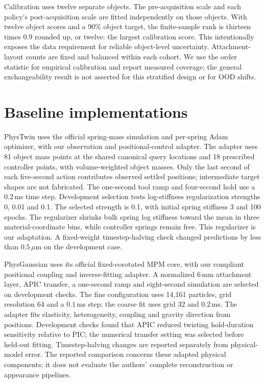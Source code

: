 \documentclass[10pt,twocolumn,letterpaper]{article}
\begin{document}
Calibration uses twelve separate objects. The pre-acquisition scale and each policy's post-acquisition scale are fitted independently on those objects. With twelve object scores and a 90\% object target, the finite-sample rank is thirteen times 0.9 rounded up, or twelve: the largest calibration score. This intentionally exposes the data requirement for reliable object-level uncertainty. Attachment-layout counts are fixed and balanced within each cohort. We use the order statistic for empirical calibration and report measured coverage; the general exchangeability result is not asserted for this stratified design or for OOD shifts.

\section{Baseline implementations}
PhysTwin uses the official spring-mass simulation and per-spring Adam optimizer, with our observation and positional-control adapter. The adapter uses 81 object mass points at the shared canonical query locations and 18 prescribed controller points, with volume-weighted object masses. Only the last second of each five-second action contributes observed settled positions; intermediate target shapes are not fabricated. The one-second tool ramp and four-second hold use a $0.2$\,ms time step. Development selection tests log-stiffness regularization strengths 0, 0.01 and 0.1. The selected strength is 0.1, with initial spring stiffness 3 and 100 epochs. The regularizer shrinks bulk spring log stiffness toward the mean in three material-coordinate bins, while controller springs remain free. This regularizer is our adaptation. A fixed-weight timestep-halving check changed predictions by less than $0.5\,\mu$m on the development case.

PhysGaussian uses its official fixed-corotated MPM core, with our compliant positional coupling and inverse-fitting adapter. A normalized 6\,mm attachment layer, APIC transfer, a one-second ramp and eight-second simulation are selected on development checks. The fine configuration uses 14,161 particles, grid resolution 64 and a $0.1$\,ms step; the coarse fit uses grid 32 and $0.2$\,ms. The adapter fits elasticity, heterogeneity, coupling and gravity direction from positions. Development checks found that APIC reduced twisting hold-duration sensitivity relative to PIC; the numerical transfer setting was selected before held-out fitting. Timestep-halving changes are reported separately from physical-model error. The reported comparison concerns these adapted physical components; it does not evaluate the authors' complete reconstruction or appearance pipelines.
\end{document}
